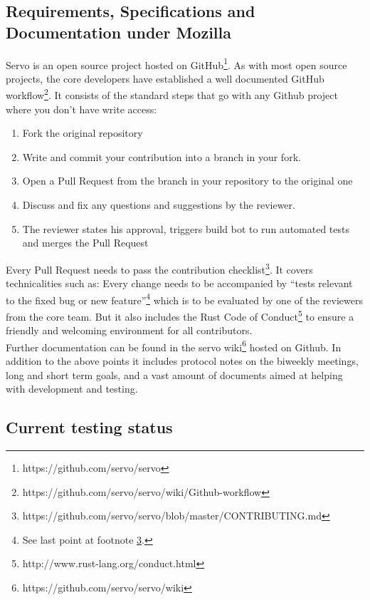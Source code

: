 \documentclass{scrartcl}
\begin{document}
\subsection{Requirements, Specifications and Documentation under Mozilla}
Servo is an open source project hosted on GitHub\footnote{https://github.com/servo/servo}. As with most open source projects, the core developers have established a well documented GitHub workflow\footnote{https://github.com/servo/servo/wiki/Github-workflow}. It consists of the standard steps that go with any Github project where you don't have write access:
\begin{enumerate}
    \item Fork the original repository
    \item Write and commit your contribution into a branch in your fork.
    \item Open a Pull Request from the branch in your repository to the original one
    \item Discuss and fix any questions and suggestions by the reviewer.
    \item The reviewer states his approval, triggers build bot to run automated tests and merges the Pull Request
\end{enumerate}

Every Pull Request needs to pass the contribution checklist\footnote{\label{contributing}https://github.com/servo/servo/blob/master/CONTRIBUTING.md}. It covers technicalities such as: Every change needs to be accompanied by ``tests relevant to the fixed bug or new feature''\footnote{See last point at footnote \ref{contributing}.} which is to be evaluated by one of the reviewers from the core team. But it also includes the Rust Code of Conduct\footnote{http://www.rust-lang.org/conduct.html} to ensure a friendly and welcoming environment for all contributors.  \\

Further documentation can be found in the servo wiki\footnote{https://github.com/servo/servo/wiki} hosted on Github. In addition to the above points it includes protocol notes on the biweekly meetings, long and short term goals, and a vast amount of documents aimed at helping with development and testing.

\subsection{Current testing status} \label{test_status}
\end{document}
